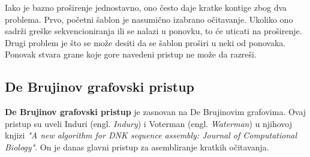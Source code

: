 \documentclass[12pt,oneside]{memoir}
\begin{document}
Iako je bazno proširenje jednostavno, ono često daje kratke kontige zbog dva problema. Prvo, početni šablon je nasumično izabrano očitavanje. Ukoliko ono sadrži greške sekvencioniranja ili se nalazi u ponovku, to će uticati na proširenje. Drugi problem je što se može desiti da se šablon proširi u neki od ponovaka. Ponovak stvara grane koje gore navedeni pristup ne može da razreši.

\begin{comment}
Da bismo rešili prvi problem, biramo očitavanje za šablon, ako je malo verovatno da ono sadrži grešku sekvenciranja ili ako je malo verovatno da će biti u ponovljenom regionu. Koristeći ideju u sekciji 5.3.1, broje se frekvencije svih k-mera svih očitavanja. Očitavanje R se bira za šablon, ako su frekvencije svih njegovih k-mera unutar nekih korisnički definisanih pragova $\theta_{min}$ i $\theta_{max}$. Ako je broj pojavljivanja nekog k-mera manji od $\theta_{min}$, R će verovatno sadržati grešku sekvenciranja. Ako je broj pojavljivanja nekog k-mera veći od $\theta_{max}$, R će se verovatno naći u ponovljenom regionu. Ova dva praga mogu biti određena proučavanjem histograma frekvencija svih k-mera ulaznih sekvenci očitavanja.

Za drugi problem, rešenje je korišćenje informacija o povezivanju paired-end očitavanja za rešavanje nasumičnosti. Ovaj pristup je korišćen od strane $PE-asemblera [9]$. Figura 5.14 ilustruje tu ideju. Pretpostavimo da možemo proširiti šablon koristeći 2 različita očitavanja (crno i sivo). Ne možemo odlučiti koje je ispravo (pogledati Figuru 5.14(a)). Kako svako očitavanje ima svog para, možemo biti u stanju da donesemo odluku. Postoje 2 slučaja. U prvom slučaju, ako parnjak crnom očitavanju može biti poravnat sa šablonom, možemo verovati crnom očitavanju (Figura 5.14(b)). U drugom slučaju, pretpostavimo  da postoji nekoliko očitavanja R koja su poravnata sa šablonom i parnjaci od R mogu biti poravnati sa panjakom crnog očitavanja (pogledati Figuru 5.14(c)). Onda možemo verovati i crnom očitavanju. Drugim rečima, informacije o povezanosti paired-end očitavanja mogu pomoći u  filtriranju onih lažno pozitivnih poravnanja.
\end{comment}

\subsection{De Brujinov grafovski pristup}

\textbf{De Brujinov grafovski pristup} je zasnovan na De Brujinovim grafovima. Ovaj pristup su uveli Induri (engl. \textit{Indury}) i Voterman (engl. \textit{Waterman}) u njihovoj knjizi \textit{"A new algorithm for DNK sequence assembly: Journal of Computational Biology"}. On je danas glavni pristup za asembliranje kratkih očitavanja.
\end{document}
